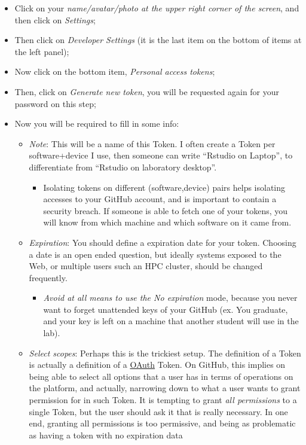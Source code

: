 \documentclass[
]{book}
\providecommand{\tightlist}{%
  \setlength{\itemsep}{0pt}\setlength{\parskip}{0pt}}
\begin{document}
\begin{itemize}
\tightlist
\item
  Click on your \emph{name/avatar/photo at the upper right corner of the screen}, and then click on \emph{Settings};
\item
  Then click on \emph{Developer Settings} (it is the last item on the bottom of items at the left panel);
\item
  Now click on the bottom item, \emph{Personal access tokens};
\item
  Then, click on \emph{Generate new token}, you will be requested again for your password on this step;
\item
  Now you will be required to fill in some info:

  \begin{itemize}
  \tightlist
  \item
    \emph{Note}: This will be a name of this Token. I often create a Token per software+device I use, then someone can write ``Rstudio on Laptop'', to differentiate from ``Rstudio on laboratory desktop''.

    \begin{itemize}
    \tightlist
    \item
      Isolating tokens on different (software,device) pairs helps isolating accesses to your GitHub account, and is important to contain a security breach. If someone is able to fetch one of your tokens, you will know from which machine and which software on it came from.
    \end{itemize}
  \item
    \emph{Expiration}: You should define a expiration date for your token. Choosing
    a date is an open ended question, but ideally systems exposed to the Web, or
    multiple users such an HPC cluster, should be changed frequently.

    \begin{itemize}
    \tightlist
    \item
      \emph{Avoid at all means to use the No expiration} mode, because you never
      want to forget unattended keys of your GitHub (ex. You graduate, and your
      key is left on a machine that another student will use in the lab).
    \end{itemize}
  \item
    \emph{Select scopes}: Perhaps this is the trickiest setup. The definition of a
    Token is actually a definition of a \href{https://en.wikipedia.org/wiki/OAuth}{OAuth}
    Token. On GitHub, this implies on being able to select all options that a user
    has in terms of operations on the platform, and actually, narrowing down to
    what a user wants to grant permission for in such Token. It is tempting to
    grant \emph{all permissions} to a single Token, but the user should ask it that is
    really necessary. In one end, granting all permissions is too permissive, and
    being as problematic as having a token with no expiration data
  \end{itemize}
\end{itemize}
\end{document}
